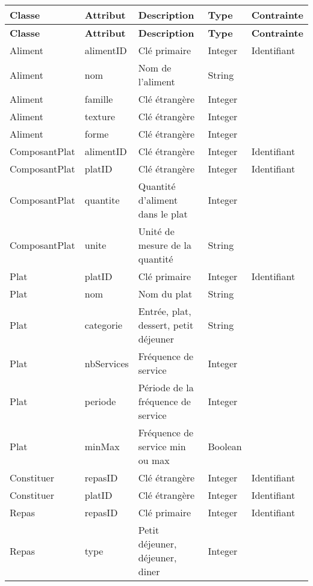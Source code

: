 \begin{longtable}{llp{5cm}ll}
  \hline
  \rowcolor{green}\textbf{Classe} & \textbf{Attribut} & \textbf{Description} & \textbf{Type} & \textbf{Contrainte} \\ \endfirsthead \hline
  \rowcolor{green}\textbf{Classe} & \textbf{Attribut} & \textbf{Description} & \textbf{Type} & \textbf{Contrainte} \\ \endhead \hline
  Aliment & alimentID & Clé primaire & Integer & Identifiant \\
  Aliment & nom & Nom de l'aliment & String & \\
  Aliment & famille & Clé étrangère & Integer & \\
  Aliment & texture & Clé étrangère & Integer & \\
  Aliment & forme & Clé étrangère & Integer & \\ \hline

  ComposantPlat & alimentID & Clé étrangère & Integer & Identifiant \\
  ComposantPlat & platID & Clé étrangère & Integer & Identifiant \\
  ComposantPlat & quantite & Quantité d'aliment dans le plat & Integer & \\
  ComposantPlat & unite & Unité de mesure de la quantité & String & \\ \hline

  Plat & platID & Clé primaire & Integer & Identifiant \\
  Plat & nom & Nom du plat & String & \\
  Plat & categorie & Entrée, plat, dessert, petit déjeuner & String & \\
  Plat & nbServices & Fréquence de service & Integer & \\
  Plat & periode & Période de la fréquence de service & Integer & \\
  Plat & minMax & Fréquence de service min ou max & Boolean & \\ \hline

  Constituer & repasID & Clé étrangère & Integer & Identifiant \\
  Constituer & platID & Clé étrangère & Integer & Identifiant \\ \hline

  Repas & repasID & Clé primaire & Integer & Identifiant \\
  Repas & type & Petit déjeuner, déjeuner, diner & Integer \\


\end{longtable}
